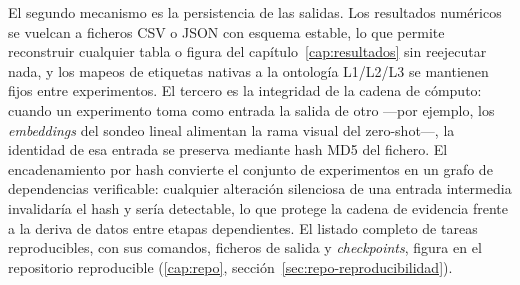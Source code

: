 El segundo mecanismo es la persistencia de las salidas. Los
resultados numéricos se vuelcan a ficheros CSV o JSON con esquema
estable, lo que permite reconstruir cualquier tabla o figura del
capítulo~\ref{cap:resultados} sin reejecutar nada, y los mapeos de
etiquetas nativas a la ontología L1/L2/L3 se mantienen fijos entre
experimentos. El tercero es la integridad de la cadena de cómputo:
cuando un experimento toma como entrada la salida de otro ---por
ejemplo, los \emph{embeddings} del sondeo lineal alimentan la rama
visual del zero-shot---, la identidad de esa entrada se preserva
mediante hash MD5 del fichero. El encadenamiento por hash convierte
el conjunto de experimentos en un grafo de dependencias verificable:
cualquier alteración silenciosa de una entrada intermedia
invalidaría el hash y sería detectable, lo que protege la cadena de
evidencia frente a la deriva de datos entre etapas dependientes. El
listado completo de tareas reproducibles, con sus comandos, ficheros
de salida y \emph{checkpoints}, figura en el
repositorio reproducible (\ref{cap:repo}, sección~\ref{sec:repo-reproducibilidad}).
